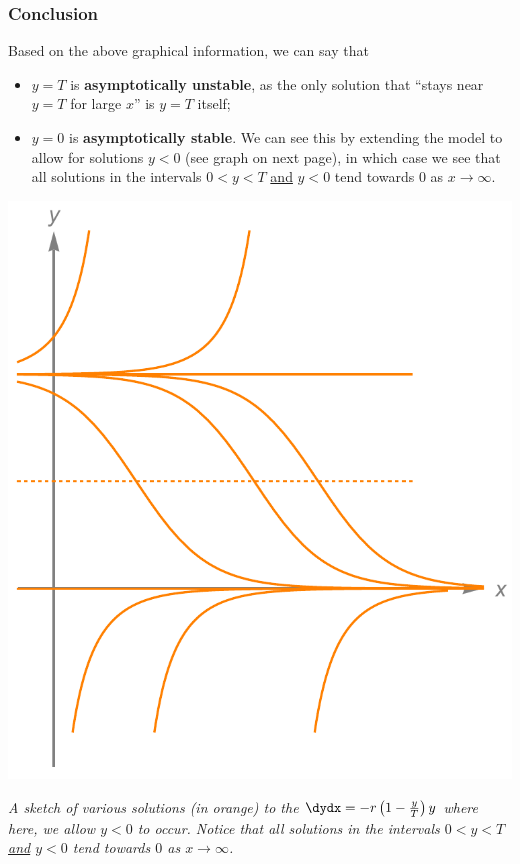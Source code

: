 \documentclass[12pt]{article}
\theoremstyle{definition}
\theoremstyle{underl}
\newcommand{\capt}[1]{\begin{adjustwidth}{0.5in}{0.5in}\centering\small\textit{#1}\end{adjustwidth}}
\begin{document}
	\subsubsection*{Conclusion}
	Based on the above graphical information, we can say that 
	\begin{itemize}
		\item $y=T$ is \textbf{asymptotically unstable}, as the only solution that ``stays near $y=T$ for large $x$'' is $y=T$ itself;
		\item $y=0$ is \textbf{asymptotically stable}. We can see this by extending the model to allow for solutions $y<0$ (see graph on next page), in which case we see that all solutions in the intervals $0<y<T$ \ul{and} $y<0$ tend towards $0$ as $x\to\infty$.
	\end{itemize}	

	\newpage
	
	\vspace*{\fill}
	\begin{center}
		\includegraphics[scale=1]{Ex1_xy_4}
		\vspace{1.5mm}
		\capt{A sketch of various solutions (in orange) to the {\normalfont{ODE}} $\textstyle \dydx = -r\left(1-\frac{y}{T}\right) y$ where here, we allow $y<0$ to occur. Notice that all solutions in the intervals $0<y<T$ \ul{and} $y<0$ tend towards $0$ as $x\to\infty$.}
	\end{center}
	\vspace*{\fill}
	
\end{document}
